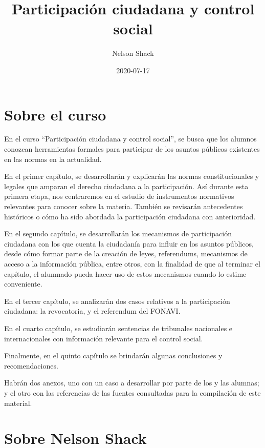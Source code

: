 \documentclass[
]{book}
\title{Participación ciudadana y control social}
\author{Nelson Shack}
\date{2020-07-17}
\begin{document}
\maketitle

{
\setcounter{tocdepth}{1}
\tableofcontents
}
\hypertarget{sobre-el-curso}{%
\chapter*{Sobre el curso}\label{sobre-el-curso}}

En el curso ``Participación ciudadana y control social'', se busca que los alumnos conozcan herramientas formales para participar de los asuntos públicos existentes en las normas en la actualidad.

En el primer capítulo, se desarrollarán y explicarán las normas constitucionales y legales que amparan el derecho ciudadana a la participación. Así durante esta primera etapa, nos centraremos en el estudio de instrumentos normativos relevantes para conocer sobre la materia. También se revisarán antecedentes históricos o cómo ha sido abordada la participación ciudadana con anterioridad.

En el segundo capítulo, se desarrollarán los mecanismos de participación ciudadana con los que cuenta la ciudadanía para influir en los asuntos públicos, desde cómo formar parte de la creación de leyes, referendums, mecanismos de acceso a la información pública, entre otros, con la finalidad de que al terminar el capítulo, el alumnado pueda hacer uso de estos mecanismos cuando lo estime conveniente.

En el tercer capítulo, se analizarán dos casos relativos a la participación ciudadana: la revocatoria, y el referendum del FONAVI.

En el cuarto capítulo, se estudiarán sentencias de tribunales nacionales e internacionales con información relevante para el control social.

Finalmente, en el quinto capítulo se brindarán algunas conclusiones y recomendaciones.

Habrán dos anexos, uno con un caso a desarrollar por parte de los y las alumnas; y el otro con las referencias de las fuentes consultadas para la compilación de este material.

\hypertarget{sobre-nelson-shack}{%
\chapter*{Sobre Nelson Shack}\label{sobre-nelson-shack}}
\end{document}
